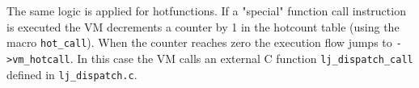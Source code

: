\noindent
The same logic is applied for hotfunctions. If a "special" function call instruction is executed the VM decrements a counter by 1 in the hotcount table (using the macro \texttt{hot\_call}). When the counter reaches zero the execution flow jumps to \texttt{->vm\_hotcall}. In this case the VM calls an external C function \texttt{lj\_dispatch\_call} defined in \texttt{lj\_dispatch.c}.

